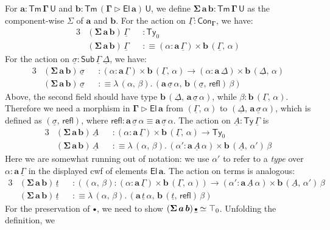 \documentclass[12pt,a4paper,twoside,openany]{book}
\theoremstyle{remark}
\theoremstyle{definition}
\theoremstyle{theorem}
\newcommand{\bs}[1]{\boldsymbol{#1}}
\newcommand{\refl}{\mathsf{refl}}
\newcommand{\Con}{\mathsf{Con}}
\newcommand{\Sub}{\mathsf{Sub}}
\newcommand{\Tm}{\mathsf{Tm}}
\newcommand{\Ty}{\mathsf{Ty}}
\newcommand{\U}{\mathsf{U}}
\newcommand{\El}{\mathsf{El}}
\newcommand{\ext}{\triangleright}
\newcommand{\emptycon}{\scaleobj{.75}\bullet}
\newcommand{\bGamma}{\bs{\Gamma}}
\newcommand{\ba}{\bs{a}}
\newcommand{\bb}{\bs{b}}
\newcommand{\ul}[1]{\underline{#1}}
\newcommand{\ulGamma}{\ul{\Gamma}}
\newcommand{\ulDelta}{\ul{\Delta}}
\newcommand{\ulsigma}{\ul{\sigma}}
\newcommand{\ulemptycon}{\ul{\emptycon}}
\newcommand{\ult}{\ul{t}}
\newcommand{\ulA}{\ul{A}}
\newcommand{\defn}{:\equiv}
\begin{document}
For $\bs{a : \Tm\,\Gamma\,\U}$ and $\bs{b : \Tm\,(\Gamma\ext \El\,a)\,\U}$, we
define $\bs{\Sigma\,a\,b : \Tm\,\Gamma\,\U}$ as the component-wise $\Sigma$ of $\ba$
and $\bb$. For the action on $\ulGamma : \Con_{\bGamma}$, we have:
\begin{alignat*}{3}
  &(\bs{\Sigma\,a\,b})\,\ulGamma && : \Ty_0 \\
  &(\bs{\Sigma\,a\,b})\,\ulGamma &&\defn (\alpha : \ba\,\ulGamma) \times \bb\,(\ulGamma,\,\alpha)
\end{alignat*}
For the action on $\ulsigma : \Sub\,\ulGamma\,\ulDelta$, we have:
\begin{alignat*}{3}
  &(\bs{\Sigma\,a\,b})\,\ulsigma && : (\alpha : \ba\,\ulGamma) \times \bb\,(\ulGamma,\,\alpha)
    \to (\alpha : \ba\,\ulDelta) \times \bb\,(\ulDelta,\,\alpha)\\
  &(\bs{\Sigma\,a\,b})\,\ulsigma &&\defn \lambda\,(\alpha,\,\beta).\,(\ba\,\ulsigma\,\alpha,\,\bb\,(\ulsigma,\,\refl)\,\beta)
\end{alignat*}
Above, the second field should have type
$\bb\,(\ulDelta,\,\ba\,\ulsigma\,\alpha)$, while $\beta :
\bb\,(\ulGamma,\,\alpha)$. Therefore we need a morphism in $\bs{\Gamma \ext
  \El\,a}$ from $(\ulGamma,\,\alpha)$ to $(\ulDelta,\,\ba\,\ulsigma\,\alpha)$,
which is defined as $(\ulsigma,\,\refl)$, where $\refl : \ba\,\ulsigma\,\alpha
\equiv \ba\,\ulsigma\,\alpha$.
The action on $\ulA : \Ty\,\ulGamma$ is
\begin{alignat*}{3}
  &(\bs{\Sigma\,a\,b})\,\ulA &&: (\alpha : \ba\,\ulGamma) \times \bb\,(\ulGamma,\,\alpha)
    \to \Ty_0\\
  &(\bs{\Sigma\,a\,b})\,\ulA &&\defn \lambda\,(\alpha,\,\beta).\,(\alpha' : \ba\,\ulA\,\alpha) \times \bb\,(\ulA,\,\alpha')\,\beta
\end{alignat*}
Here we are somewhat running out of notation: we use $\alpha'$ to refer to a
\emph{type} over $\alpha : \ba\,\ulGamma$ in the displayed cwf of elements
$\bs{\El\,a}$. The action on terms is analogous:
\begin{alignat*}{3}
  &(\bs{\Sigma\,a\,b})\,\ult && : ((\alpha,\,\beta) : (\alpha : \ba\,\ulGamma) \times \bb\,(\ulGamma,\,\alpha))
    \to (\alpha' : \ba\,\ulA\,\alpha) \times \bb\,(\ulA,\,\alpha')\,\beta\\
  &(\bs{\Sigma\,a\,b})\,\ult &&\defn \lambda\,(\alpha,\,\beta).\,(\ba\,\ult\,\alpha,\,\bb\,(\ult,\,\refl)\,\beta)
\end{alignat*}
For the preservation of $\emptycon$, we need to show
$(\bs{\Sigma\,a\,b})\,\ulemptycon \simeq \top_0$. Unfolding the definition, we
\end{document}
